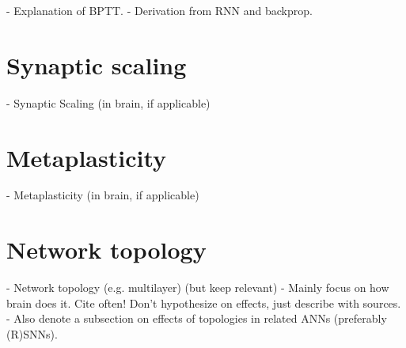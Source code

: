         \begin{tcolorbox}[colback=orange]
        - Explanation of BPTT.
        - Derivation from RNN and backprop.
        \vspace{20cm}

        \end{tcolorbox}

\section{Synaptic scaling}

    \begin{tcolorbox}[colback=orange]
    - Synaptic Scaling (in brain, if applicable)
    \vspace{10cm}

    \end{tcolorbox}

\section{Metaplasticity}

    \begin{tcolorbox}[colback=orange]
    - Metaplasticity (in brain, if applicable)
    \vspace{10cm}

    \end{tcolorbox}

\section{Network topology}

    \begin{tcolorbox}[colback=orange]
      - Network topology (e.g. multilayer) (but keep relevant)
      - Mainly focus on how brain does it. Cite often! Don't hypothesize on effects, just describe with sources.
      - Also denote a subsection on effects of topologies in related ANNs (preferably (R)SNNs).
    \vspace{15cm}

    \end{tcolorbox}
